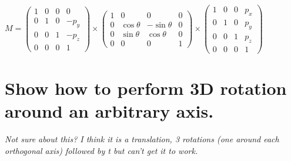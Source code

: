 \documentclass{supervision}
\begin{document}
\begin{questions}
\begin{parts}
\begin{solution}
        \begin{center}
        $
            M =
            \begin{pmatrix}
            1 & 0 & 0 & 0 \\
            0 & 1 & 0 & -p_y \\
            0 & 0 & 1 & -p_z \\
            0 & 0 & 0 & 1
            \end{pmatrix}
            \times
            \begin{pmatrix}
            1 & 0 & 0 & 0\\
            0 & \cos{\theta} & -\sin{\theta} & 0 \\ 
            0 & \sin{\theta} &  \cos{\theta} & 0 \\ 
            0 & 0            & 0             & 1
            \end{pmatrix}
            \times
            \begin{pmatrix}
            1 & 0 & 0 & p_x \\
            0 & 1 & 0 & p_y \\
            0 & 0 & 1 & p_z \\
            0 & 0 & 0 & 1
            \end{pmatrix}
            $
        \end{center}

        \end{solution}

        \part{Show how to perform 3D rotation around an arbitrary axis.}
        \begin{solution}
        \textit{Not sure about this? I think it is a translation, 3 rotations (one around each orthogonal axis) followed by t but can't get it to work.}
        \end{solution}

    \end{parts}
    
\end{questions}
\end{document}
